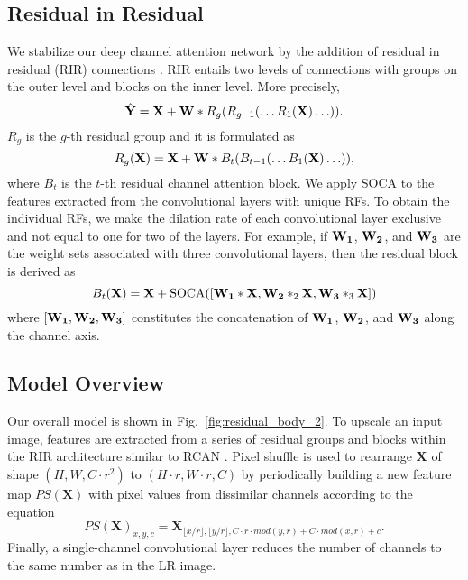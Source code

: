 \documentclass[runningheads]{llncs}
\begin{document}
\subsection{Residual in Residual}
\label{subsec:residual_in_residual}
We stabilize our deep channel attention network by the addition of residual in
residual (RIR) connections \cite{zhang2018image}. RIR entails two
levels of connections with groups on the outer level and blocks on the inner
level. More precisely, 
\begin{equation}
\hat{{\bf Y}} = {\bf X} + {\bf W} \ast R_g(R_{g-1}(\ldots R_1({\bf X})\ldots)).
\end{equation}
$R_g$ is the $g$-th residual group and it is formulated as
\begin{equation}
R_g({\bf X}) = {\bf X} + {\bf W} \ast B_t(B_{t -1}(\ldots B_1({\bf X})\ldots)),
\label{eq:residual_groups}
\end{equation}
where $B_t$ is the $t$-th residual channel attention block. We apply SOCA to
the features extracted from the convolutional layers with unique RFs. To obtain
the individual RFs, we make the dilation rate of each convolutional layer
exclusive and not equal to one for two of the layers. For example, if $\bf
W_1$, $\bf W_2$, and $\bf W_3$ are the weight sets associated with three
convolutional layers, then the residual block is derived as
\begin{equation}
B_t({\bf X}) = {\bf X} + \text{SOCA}([{\bf W_1} \ast {\bf X}, {\bf W_2} \ast_2 {\bf X}, {\bf W_3} \ast_3 {\bf X}])
\label{eq:residual_block}
\end{equation}
where $[{\bf W_1}, {\bf W_2}, {\bf W_3}]$ constitutes the concatenation of $\bf
W_1$, $\bf W_2$, and $\bf W_3$ along the channel axis.

\subsection{Model Overview}
\label{subsec:model_overview}
Our overall model is shown in Fig.~\ref{fig:residual_body_2}. To upscale an
input image, features are extracted from a series of residual groups and blocks
within the RIR architecture similar to RCAN \cite{zhang2018image}. Pixel
shuffle \cite{shi2016real} is used to rearrange $\bm{X}$ of shape $(H,W,C\cdot
r^2)$ to $(H\cdot r,W\cdot r,C)$ by periodically building a new feature map
$PS(\bm{X})$ with pixel values from dissimilar channels according to the
equation 
\begin{equation}
  PS(\bm{X})_{x,y,c} = \bm{X}_{\lfloor x / r \rfloor, \lfloor y / r \rfloor, C \cdot r \cdot mod(y,r) + C \cdot mod(x,r) + c}.
\end{equation}
Finally, a single-channel convolutional layer reduces the number of channels to
the same number as in the LR image.
\end{document}
